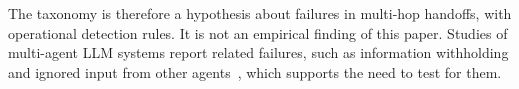 The taxonomy is therefore a hypothesis about failures in multi-hop handoffs, with operational detection rules. It is not an empirical finding of this paper. Studies of multi-agent LLM systems report related failures, such as information withholding and ignored input from other agents~\cite{cemri2025fail}, which supports the need to test for them.
